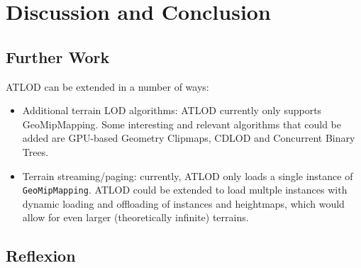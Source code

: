 \chapter{Discussion and Conclusion}
\section{Further Work}
ATLOD can be extended in a number of ways:
\begin{itemize}
  \item Additional terrain LOD algorithms: ATLOD currently only supports GeoMipMapping. Some interesting and relevant algorithms that could be added 
        are GPU-based Geometry Clipmaps, CDLOD and Concurrent Binary Trees.
  \item Terrain streaming/paging: currently, ATLOD only loads a single instance of \texttt{GeoMipMapping}. ATLOD could be extended to load multple 
        instances with dynamic loading and offloading of instances and heightmaps, which would allow for even larger (theoretically infinite) terrains.
\end{itemize}
\section{Reflexion}

